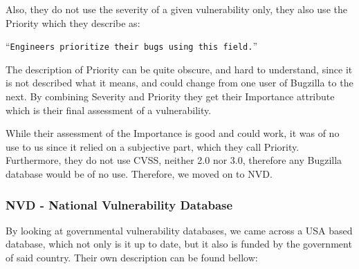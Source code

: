Also, they do not use the severity of a given vulnerability only, they also use the Priority which they describe as:

\enquote{\texttt{Engineers prioritize their bugs using this field.}}\parencite{bugzilla}

The description of Priority can be quite obscure, and hard to understand, since it is not described what it means, and could change from one user of Bugzilla to the next. By combining Severity and Priority they get their Importance attribute which is their final assessment of a vulnerability.

While their assessment of the Importance is good and could work, it was of no use to us since it relied on a subjective part, which they call Priority. Furthermore, they do not use CVSS, neither 2.0 nor 3.0, therefore any Bugzilla database would be of no use. Therefore, we moved on to NVD.

\subsubsection{NVD - National Vulnerability Database}

By looking at governmental vulnerability databases, we came across a USA based database, which not only is it up to date, but it also is funded by the government of said country. Their own description can be found bellow:\\

